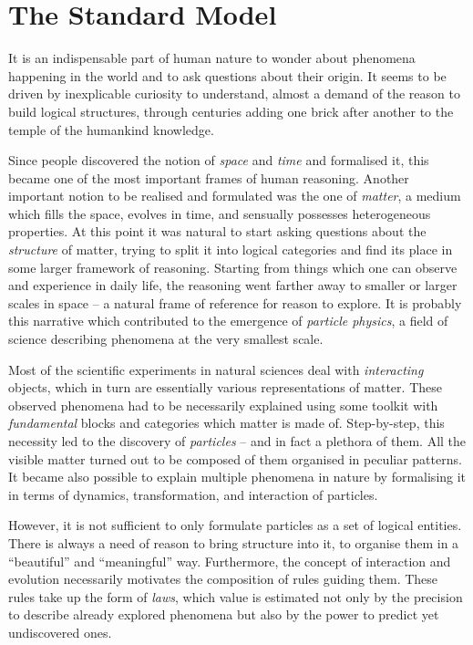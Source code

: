 \chapter{The Standard Model}\label{sec:sm}

It is an indispensable part of human nature to wonder about phenomena happening in the world and to ask questions about their origin. It seems to be driven by inexplicable curiosity to understand, almost a demand of the reason to build logical structures, through centuries adding one brick after another to the temple of the humankind knowledge. 

Since people discovered the notion of \textit{space} and \textit{time} and formalised it, this became one of the most important frames of human reasoning. Another important notion to be realised and formulated was the one of \textit{matter}, a medium which fills the space, evolves in time, and sensually possesses heterogeneous properties. At this point it was natural to start asking questions about the \textit{structure} of matter, trying to split it into logical categories and find its place in some larger framework of reasoning. Starting from things which one can observe and experience in daily life, the reasoning went farther away to smaller or larger scales in space -- a natural frame of reference for reason to explore. It is probably this narrative which contributed to the emergence of \textit{particle physics}, a field of science describing phenomena at the very smallest scale. 

Most of the scientific experiments in natural sciences deal with \textit{interacting} objects, which in turn are essentially various representations of matter. These observed phenomena had to be necessarily explained using some toolkit with \textit{fundamental} blocks and categories which matter is made of. Step-by-step, this necessity led to the discovery of \textit{particles} -- and in fact a plethora of them. All the visible matter turned out to be composed of them organised in peculiar patterns. It became also possible to explain multiple phenomena in nature by formalising it in terms of dynamics, transformation, and interaction of particles. 

However, it is not sufficient to only formulate particles as a set of logical entities. There is always a need of reason to bring structure into it, to organise them in a \enquote{beautiful} and \enquote{meaningful} way. Furthermore, the concept of interaction and evolution necessarily motivates the composition of rules guiding them. These rules take up the form of \textit{laws}, which value is estimated not only by the precision to describe already explored phenomena but also by the power to predict yet undiscovered ones.


